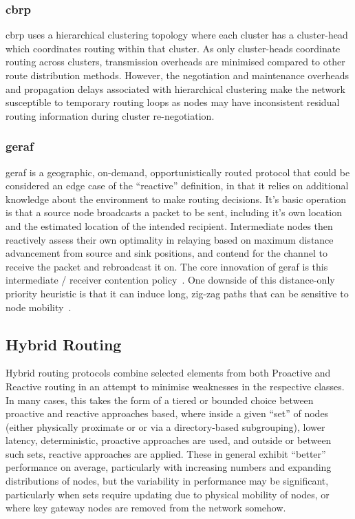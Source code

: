 {\subsubsection{\gls{cbrp}}
\gls{cbrp} uses a hierarchical clustering topology where each cluster has a cluster-head which coordinates routing within that cluster. As only cluster-heads coordinate routing across clusters, transmission overheads are minimised compared to other route distribution methods. However, the negotiation and maintenance overheads and propagation delays associated with hierarchical clustering make the network susceptible to temporary routing loops as nodes may have inconsistent residual routing information during cluster re-negotiation.

\subsubsection{\gls{geraf}}
\gls{geraf} is a geographic, on-demand, opportunistically routed protocol that could be considered an edge case of the ``reactive'' definition, in that it relies on additional knowledge about the environment to make routing decisions.
It's basic operation is that a source node broadcasts a packet to be sent, including it's own location and the estimated location of the intended recipient.
Intermediate nodes then reactively assess their own optimality in relaying based on maximum distance advancement from source and sink positions, and contend for the channel to receive the packet and rebroadcast it on.
The core innovation of \gls{geraf} is this intermediate / receiver contention policy~\cite{Zorzi2003,Zorzi2003a}.
One downside of this distance-only priority heuristic is that it can induce long, zig-zag paths that can be sensitive to node mobility~\cite{Jornet2008}.

\subsection{Hybrid Routing}

Hybrid routing protocols combine selected elements from both Proactive and Reactive routing  in an attempt to minimise weaknesses in the respective classes.
In many cases, this takes the form of a tiered or bounded choice between proactive and reactive approaches based, where inside a given ``set'' of nodes (either physically proximate or or via a directory-based subgrouping), lower latency, deterministic, proactive approaches are used, and outside or between such sets, reactive approaches are applied.
These in general exhibit ``better'' performance on average, particularly with increasing numbers and expanding distributions of nodes, but the variability in performance may be significant, particularly when sets require updating due to physical mobility of nodes, or where key gateway nodes are removed from the network somehow. 

}
